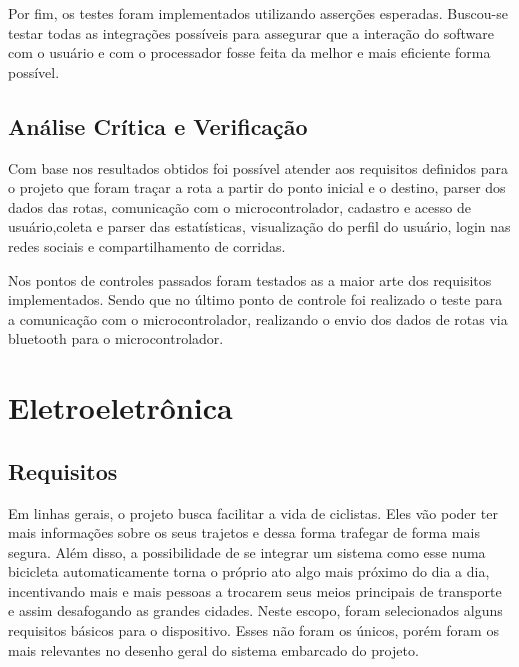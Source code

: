 	Por fim, os testes foram implementados utilizando asserções esperadas. Buscou-se testar todas as integrações possíveis para assegurar que a interação do software com o usuário e com o processador fosse feita da melhor e mais eficiente forma possível.
	
	\subsection{Análise Crítica e Verificação}
	Com base nos resultados obtidos foi possível atender aos requisitos definidos para o projeto que foram traçar a rota a partir do ponto inicial e o destino, parser dos dados das rotas, comunicação com o microcontrolador, cadastro e acesso de usuário,coleta e parser das estatísticas, visualização do perfil do usuário, login nas redes sociais e compartilhamento de corridas.
	
	Nos pontos de controles passados foram testados as a maior arte dos requisitos implementados. Sendo que no último ponto de controle foi realizado o teste para a comunicação com o microcontrolador, realizando o envio dos dados de rotas via bluetooth para o microcontrolador.
  
\section{Eletroeletrônica}
	
	\subsection{Requisitos}
	Em linhas gerais, o projeto busca facilitar a vida de ciclistas. Eles vão poder ter mais informações sobre os seus trajetos e dessa forma trafegar de forma mais segura. Além disso, a possibilidade de se integrar um sistema como esse numa bicicleta automaticamente torna o próprio ato algo mais próximo do dia a dia, incentivando mais e mais pessoas a trocarem seus meios principais de transporte e assim desafogando as grandes cidades. 
	Neste escopo, foram selecionados alguns requisitos básicos para o dispositivo. Esses não foram os únicos, porém foram os mais relevantes no desenho geral do sistema embarcado do projeto.
	

 
